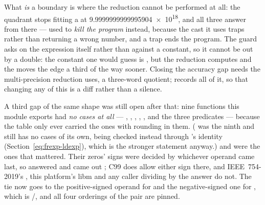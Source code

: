 What \emph{is} a boundary is where the reduction cannot be performed at all: the
quadrant stops fitting a  at \num{9.9999999999995904e18}, and all three
answer  from there ---  used to \emph{kill the program} instead,
because the cast it uses traps rather than returning a wrong number, and a trap
ends the program. The guard asks on the expression itself rather than against a
constant, so it cannot be out by a double: the constant one would guess is
, but the reduction
computes  and the  moves the edge a third of
the way sooner. Closing the accuracy gap needs the multi-precision reduction
 uses, a three-word quotient;
 records all of it, so that
changing any of this is a diff rather than a silence.

A third gap of the same shape was still open after that: nine functions this
module exports had \emph{no cases at all} --- , ,
, , , and the three predicates --- because the table
only ever carried the ones with rounding in them. ( was the ninth and still
has no cases of its own, being checked instead through 's
identity (Section~\ref{eq:frexp-ldexp}), which is the stronger statement
anyway.)  and  were
the ones that mattered. Their zeros' signs were decided by whichever operand came
last, so  answered  and 
came out ; C99 does allow either sign there, and IEEE~754-2019's
, this platform's libm and any caller dividing by the answer do not.
The tie now goes to the positive-signed operand for  and the
negative-signed one for , which is /, and all
four orderings of the  pair are pinned.

